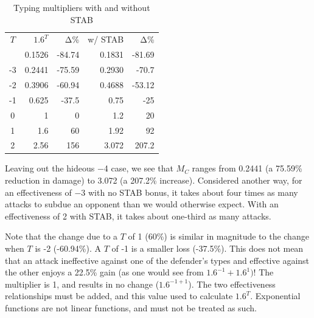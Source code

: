 \begin{table}
\begin{center}
\begin{tabular}{c r r r r}
  $T$ & $1.6^{T}$ & Δ\% & w/ STAB & Δ\% \\
\Midrule
  -4 & 0.1526 & -84.74 & 0.1831 & -81.69 \\
  -3 & 0.2441 & -75.59 & 0.2930 & -70.7 \\
  -2 & 0.3906 & -60.94 & 0.4688 & -53.12 \\
  -1 & 0.625 & -37.5 & 0.75 & -25 \\
  0 & 1 & 0 & 1.2 & 20 \\
  1 & 1.6 & 60 & 1.92 & 92 \\
  2 & 2.56 & 156 & 3.072 & 207.2 \\
\end{tabular}
  \caption{Typing multipliers with and without STAB\label{table:typemult}}
\end{center}
\end{table}

Leaving out the hideous −4 case, we see that $M_C$ ranges
 from 0.2441 (a 75.59\% reduction in damage) to 3.072
 (a 207.2\% increase).
Considered another way, for an effectiveness of −3 with no STAB bonus,
 it takes about four times as many attacks to subdue an opponent than
 we would otherwise expect.
With an effectiveness of 2 with STAB, it takes about one-third as many attacks.

Note that the change due to a $T$ of 1 (60\%) is similar in magnitude to the change
 when $T$ is -2 (-60.94\%). A $T$ of -1 is a smaller loss (-37.5\%).
This does not mean that an attack ineffective against one of the defender's types and
 effective against the other enjoys a 22.5\% gain (as one would see from $1.6^{-1} + 1.6^{1})$!
The multiplier is 1, and results in no change ($1.6^{-1+1}$).
The two effectiveness relationships must be added, and this value used to
 calculate $1.6^T$.
Exponential functions are not linear functions, and must not be treated as such.

